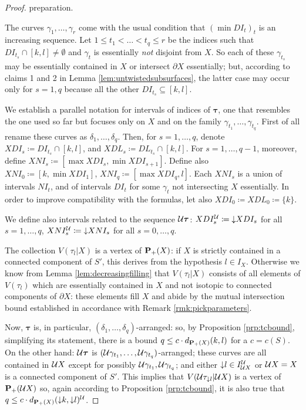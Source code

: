 \begin{proof}

 preparation.

The curves $\gamma_1,\ldots,\gamma_r$ come with the usual condition that $(\min DI_t)_t$ is an increasing sequence. Let $1\leq t_1<\ldots<t_q\leq r$ be the indices such that $DI_{t_s}\cap [k,l] \not=\emptyset$ and $\gamma_t$ is essentially \emph{not} disjoint from $X$. So each of these $\gamma_{t_s}$ may be essentially contained in $X$ or intersect $\partial X$ essentially; but, according to claims 1 and 2 in Lemma \ref{lem:untwistedsubsurfaces}, the latter case may occur only for $s=1,q$ because all the other $DI_{t_s}\subseteq [k,l]$.

We establish a parallel notation for intervals of indices of $\bm\tau$, one that resembles the one used so far but focuses only on $X$ and on the family $\gamma_{t_1},\ldots,\gamma_{t_q}$. First of all rename these curves as $\delta_1,\ldots,\delta_q$. Then, for $s=1,\ldots,q$, denote $XDI_s\coloneqq DI_{t_s}\cap [k,l]$, and $XDL_s \coloneqq DL_{t_s}\cap [k,l]$. For $s=1,\ldots, q-1$, moreover, define $XNI_s\coloneqq [\max XDI_s,\min XDI_{s+1}]$. Define also $XNI_0\coloneqq [k, \min XDI_1]$, $XNI_q\coloneqq [\max XDI_q,l]$. Each $XNI_s$ is a union of intervals $NI_t$, and of intervals $DI_t$ for some $\gamma_t$ not intersecting $X$ essentially. In order to improve compatibility with the formulas, let also $XDI_0\coloneqq XDL_0\coloneqq \{k\}$.

We define also intervals related to the sequence ${\mathcal U}\bm\tau$: $XDI_s^{\mathcal U}\coloneqq \mathord{\downarrow} XDI_s$ for all $s=1,\ldots, q$, $XNI_s^{\mathcal U}\coloneqq \mathord{\downarrow} XNI_s$ for all $s=0,\ldots, q$.

The collection $V(\tau_l|X)$ is a vertex of ${\mathbf{P}_+}(X)$: if $X$ is strictly contained in a connected component of $S'$, this derives from the hypothesis $l\in I_X$. Otherwise we know from Lemma \ref{lem:decreasingfilling} that $V(\tau_l|X)$ consists of all elements of $V(\tau_l)$ which are essentially contained in $X$ and not isotopic to connected components of $\partial X$: these elements fill $X$ and abide by the mutual intersection bound established in accordance with Remark \ref{rmk:pickparameters}.

Now, $\bm\tau$ is, in particular, $(\delta_1,\ldots,\delta_q)$-arranged: so, by Proposition \ref{prp:tcbound}, simplifying its statement, there is a bound $q\leq c\cdot d_{{\mathbf{P}_+}(X)}(k,l)$ for a $c=c(S)$. On the other hand: ${\mathcal U}\bm\tau$ is $({\mathcal U}\gamma_{t_1},\ldots,{\mathcal U}\gamma_{t_q})$-arranged; these curves are all contained in ${\mathcal U} X$ except for possibly ${\mathcal U}\gamma_{t_1}, {\mathcal U}\gamma_{t_q}$; and either $\mathord{\downarrow} l \in I_{{\mathcal U} X}^{\mathcal U}$ or ${\mathcal U} X=X$ is a connected component of $S'$. This implies that $V({\mathcal U}\tau_{\mathord{\downarrow} l}|{\mathcal U} X)$ is a vertex of ${\mathbf{P}_+}({\mathcal U} X)$ so, again according to Proposition \ref{prp:tcbound}, it is also true that $q\leq c \cdot d_{{\mathbf{P}_+}(X)}(\mathord{\downarrow} k,\mathord{\downarrow} l)^{\mathcal U}$.


\end{proof}

